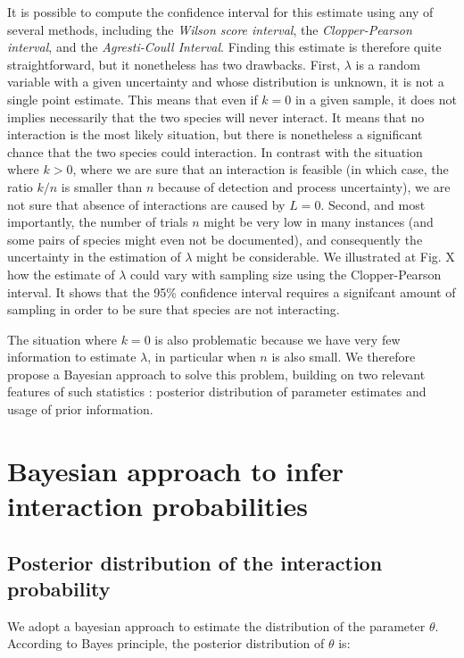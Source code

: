 \documentclass[12pt]{article}
\begin{document}
It is possible to compute the confidence interval for this estimate using any of several methods, including the \emph{Wilson score interval}, the \emph{Clopper-Pearson interval}, and the \emph{Agresti-Coull Interval}. Finding this estimate is therefore quite straightforward, but it nonetheless has two drawbacks. First, $\lambda$ is a random variable with a given uncertainty and whose distribution is unknown, it is not a single point estimate. This means that even if $k = 0$ in a given sample, it does not implies necessarily that the two species will never interact. It means that no interaction is the most likely situation, but there is nonetheless a significant chance that the two species could interaction. In contrast with the situation where $k>0$, where we are sure that an interaction is feasible (in which case, the ratio $k/n$ is smaller than $n$ because of detection and process uncertainty), we are not sure that absence of interactions are caused by $L=0$. Second, and most importantly, the number of trials $n$ might be very low in many instances (and some pairs of species might even not be documented), and consequently the uncertainty in the estimation of $\lambda$ might be considerable. We illustrated at Fig. X how the estimate of $\lambda$ could vary with sampling size using the Clopper-Pearson interval. It shows that the 95\% confidence interval requires a signifcant amount of sampling in order to be sure that species are not interacting. 

The situation where $k = 0$ is also problematic because we have very few information to estimate $\lambda$, in particular when $n$ is also small. We therefore propose a Bayesian approach to solve this problem, building on two relevant features of such statistics : posterior distribution of parameter estimates and usage of prior information. 



\section*{Bayesian approach to infer interaction probabilities}

    \subsection*{Posterior distribution of the interaction probability}

  We adopt a bayesian approach to estimate the distribution of the parameter $\theta$. According to Bayes principle, the posterior distribution of $\theta$ is:
\end{document}
